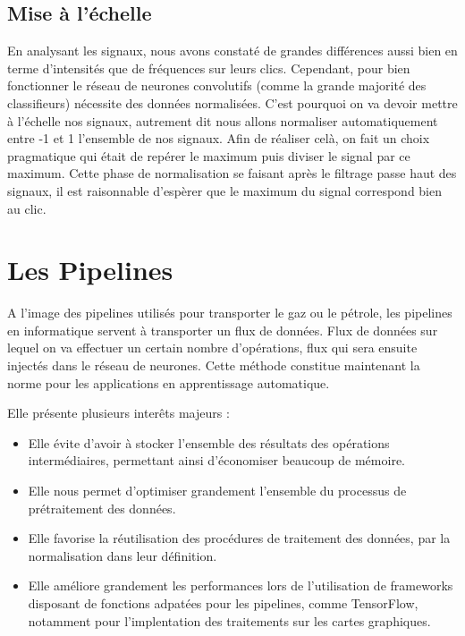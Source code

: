 \hypertarget{Mise-a-l-echelle}{%
\subsection{Mise à l'échelle}
\label{Mise-a-l-echelle}}

En analysant les signaux, nous avons constaté de grandes différences aussi bien en terme d'intensités que de fréquences sur leurs clics.
Cependant, pour bien fonctionner le réseau de neurones convolutifs (comme la grande majorité des classifieurs) nécessite des données normalisées.
C'est pourquoi on va devoir mettre à l'échelle nos signaux, autrement dit nous allons normaliser automatiquement entre -1 et 1 l'ensemble de nos signaux.
Afin de réaliser celà, on fait un choix pragmatique qui était de repérer le maximum puis diviser le signal par ce maximum.
Cette phase de normalisation se faisant après le filtrage passe haut des signaux,
il est raisonnable d'espèrer que le maximum du signal correspond bien au clic.

\hypertarget{Les-Pipelines}{%
\section{Les Pipelines}
\label{Les-Pipelines}}

A l'image des pipelines utilisés pour transporter le gaz ou le pétrole,
les pipelines en informatique servent à transporter un flux de données.
Flux de données sur lequel on va effectuer un certain nombre d'opérations, flux qui sera ensuite injectés  dans le réseau de neurones.
Cette méthode constitue maintenant la norme pour les applications en apprentissage automatique.

Elle présente plusieurs interêts majeurs :
\begin{itemize}
\item Elle évite d'avoir à stocker l'ensemble des résultats des opérations intermédiaires, permettant ainsi d'économiser beaucoup de mémoire.
\item Elle nous permet d'optimiser grandement l'ensemble du processus de prétraitement des données.
\item Elle favorise la réutilisation des procédures de traitement des données, par la normalisation dans leur définition.
\item Elle améliore grandement les performances lors de l'utilisation de frameworks disposant de fonctions adpatées pour les pipelines, comme TensorFlow, notamment pour l'implentation des traitements sur les cartes graphiques.
\end{itemize}


